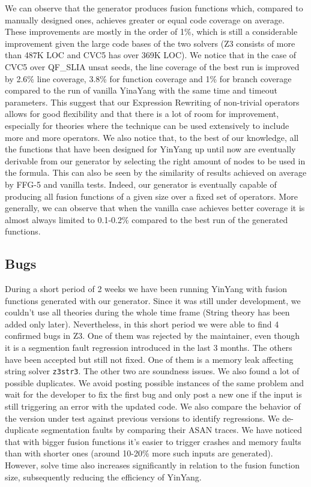 \documentclass[sigplan,screen]{acmart}
\begin{document}
We can observe that the generator produces fusion functions which, compared to manually designed ones, achieves greater or equal code coverage on average. These improvements are mostly in the order of 1\%, which is still a considerable improvement given the large code bases of the two solvers (Z3 consists of more than 487K LOC and CVC5 has over 369K LOC).
We notice that in the case of CVC5 over QF\_SLIA unsat seeds, the line coverage of the best run is improved by 2.6\% line coverage, 3.8\% for function coverage and 1\% for branch coverage compared to the run of vanilla YinaYang with the same time and timeout parameters. This suggest that our Expression Rewriting of non-trivial operators allows for good flexibility and that there is a lot of room for improvement, especially for theories where the technique can be used extensively to include more and more operators. 
We also notice that, to the best of our knowledge, all the functions that have been designed for YinYang up until now are eventually derivable from our generator by selecting the right amount of nodes to be used in the formula. This can also be seen by the similarity of results achieved on average by FFG-5 and vanilla tests. Indeed, our generator is eventually capable of producing all fusion functions of a given size over a fixed set of operators. More generally, we can observe that when the vanilla case achieves better coverage it is almost always limited to 0.1-0.2\% compared to the best run of the generated functions.

\subsection{Bugs}
During a short period of 2 weeks we have been running YinYang with fusion functions generated with our generator. Since it was still under development, we couldn't use all theories during the whole time frame (String theory has been added only later). Nevertheless, in this short period we were able to find 4 confirmed bugs in Z3. One of them was rejected by the maintainer, even though it is a segmention fault regression introduced in the last 3 months. The others have been accepted but still not fixed. One of them is a memory leak affecting string solver \texttt{z3str3}. The other two are soundness issues. We also found a lot of possible duplicates. We avoid posting possible instances of the same problem and wait for the developer to fix the first bug and only post a new one if the input is still triggering an error with the updated code. We also compare the behavior of the version under test against previous versions to identify regressions. We de-duplicate segmentation faults by comparing their ASAN traces.
We have noticed that with bigger fusion functions it's easier to trigger crashes and memory faults than with shorter ones (around 10-20\% more such inputs are generated). However, solve time also increases significantly in relation to the fusion function size, subsequently reducing the efficiency of YinYang.
\end{document}
